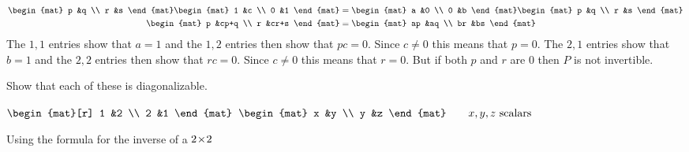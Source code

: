 \begin{exercises}
\begin{answer}
\begin{align*}
\begin{mat}
            p  &q  \\
            r  &s
         \end{mat}
         \begin{mat}
            1  &c  \\
            0  &1
         \end{mat}
         &=
         \begin{mat}
            a  &0  \\
            0  &b
         \end{mat}
         \begin{mat}
            p  &q  \\
            r  &s
         \end{mat}        \\
         \begin{mat}
            p  &cp+q  \\
            r  &cr+s
         \end{mat}
         &=
         \begin{mat}
            ap  &aq  \\
            br  &bs
         \end{mat}
      \end{align*}
      The \( 1,1 \) entries show that \( a=1 \) and the \( 1,2 \) entries
      then show that \( pc=0 \).
      Since \( c\neq 0 \) this means that \( p=0 \).
      The \( 2,1 \) entries show that 
      \( b=1 \) and the \( 2,2 \) entries then show that
      \( rc=0 \).
      Since \( c\neq 0 \) this means that \( r=0 \).
      But if both \( p \) and \( r \) are \( 0 \) then \( P \) is not
      invertible.  
     \end{answer}
  \item 
    Show that each of these is diagonalizable.
    \begin{exparts*}
      \partsitem
       \( \begin{mat}[r]
             1  &2  \\
             2  &1
          \end{mat}  \)
      \partsitem
       \( \begin{mat}
             x  &y  \\
             y  &z
          \end{mat}
          \qquad \text{$x,y,z$ scalars}  \)
    \end{exparts*}
    \begin{answer}
      \begin{exparts}
      \partsitem Using the formula for the inverse of a $2 \! \times \! 2$

\end{exparts}
\end{answer}
\end{exercises}
